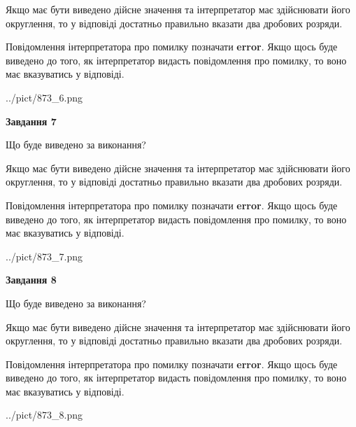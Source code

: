 \documentclass[12pt, ukrainian]{article}
\begin{document}
{\begin {Large}
Якщо має бути виведено дійсне значення та інтерпретатор має здійснювати його округлення, 
то у відповіді достатньо правильно вказати два дробових розряди.

Повідомлення інтерпретатора про помилку позначати \textbf{error}.
Якщо щось буде виведено до того, як інтерпретатор видасть повідомлення про помилку, 
то воно має вказуватись у відповіді. \par

\begin{center}
	{../pict/873_6.png}
\end{center}
\newpage

{\begin {center}\textbf{Завдання 7}\end {center}}\par
Що буде виведено за виконання? \par

Якщо має бути виведено дійсне значення та інтерпретатор має здійснювати його округлення, 
то у відповіді достатньо правильно вказати два дробових розряди.

Повідомлення інтерпретатора про помилку позначати \textbf{error}.
Якщо щось буде виведено до того, як інтерпретатор видасть повідомлення про помилку, 
то воно має вказуватись у відповіді. \par

\begin{center}
	{../pict/873_7.png}
\end{center}
\newpage

{\begin {center}\textbf{Завдання 8}\end {center}}\par
Що буде виведено за виконання? \par

Якщо має бути виведено дійсне значення та інтерпретатор має здійснювати його округлення, 
то у відповіді достатньо правильно вказати два дробових розряди.

Повідомлення інтерпретатора про помилку позначати \textbf{error}.
Якщо щось буде виведено до того, як інтерпретатор видасть повідомлення про помилку, 
то воно має вказуватись у відповіді. \par

\begin{center}
	{../pict/873_8.png}
\end{center}
\newpage


\end{Large}}
\end{document}
